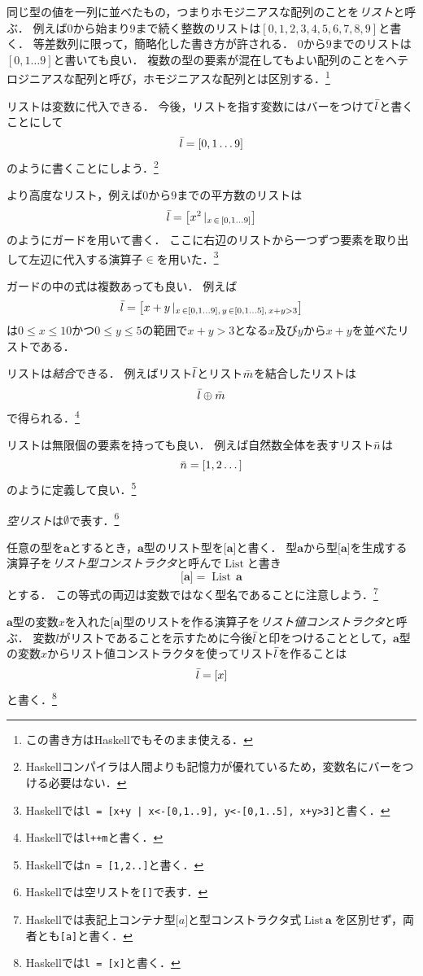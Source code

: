 \documentclass[twocolumn]{jsbook}
\newcommand{\keyword}[1]{\emph{#1}}
\newcommand{\code}[1]{\texttt{#1}}
\newcommand{\hsklType}[1]{\textbf{#1}}
\newcommand{\hsklTypeConstructor}[1]{\mathop{\mathrm{#1}}}
\DeclareMathOperator{\hsklListConstructor}{\hsklTypeConstructor{List}}
\newcommand{\hsklAppend}{\oplus}
\newcommand{\hsklEmptyList}{\emptyset}
\newcommand{\hsklList}[1]{\Bar{#1}}
\newcommand{\hsklListType}[1]{\boldsymbol{[}#1\boldsymbol{]}}
\newcommand{\hsklTypeConstruct}[2]{#1\,#2}
\DeclareMathOperator{\mathFrom}{\in}
\newcommand{\mathGuard}[1]{\mathop{\mid_{#1}}}
\begin{document}
同じ型の値を一列に並べたもの，つまりホモジニアスな配列のことを\keyword{リスト}と呼ぶ．
例えば$0$から始まり$9$まで続く整数のリストは$[0,1,2,3,4,5,6,7,8,9]$と書く．
等差数列に限って，簡略化した書き方が許される．
$0$から$9$までのリストは$[0,1\dots9]$と書いても良い．
複数の型の要素が混在してもよい配列のことをヘテロジニアスな配列と呼び，ホモジニアスな配列とは区別する．\footnote{この書き方はHaskellでもそのまま使える．}

リストは変数に代入できる．
今後，リストを指す変数にはバーをつけて$\hsklList{l}$と書くことにして$$\hsklList{l}=[0,1\dots9]$$のように書くことにしよう．\footnote{Haskellコンパイラは人間よりも記憶力が優れているため，変数名にバーをつける必要はない．}

より高度なリスト，例えば$0$から$9$までの平方数のリストは$$\hsklList{l}=\left[x^2\mathGuard{x\mathFrom{[0,1\dots9]}}\right]$$のようにガードを用いて書く．
ここに右辺のリストから一つずつ要素を取り出して左辺に代入する演算子$\mathFrom$を用いた．\footnote{Haskellでは\code{l = [x+y | x<-[0,1..9], y<-[0,1..5], x+y>3]}と書く．}

ガードの中の式は複数あっても良い．
例えば$$\hsklList{l}=\left[x+y\mathGuard{x\mathFrom[0,1\dots9],\,y\mathFrom[0,1\dots5],\,x+y>3}\right]$$は$0\le x\le 10$かつ$0\le y\le 5$の範囲で$x+y>3$となる$x$及び$y$から$x+y$を並べたリストである．

リストは\keyword{結合}できる．
例えばリスト$\hsklList{l}$とリスト$\hsklList{m}$を結合したリストは$$\hsklList{l}\hsklAppend\hsklList{m}$$で得られる．\footnote{Haskellでは\code{l++m}と書く．}

リストは無限個の要素を持っても良い．
例えば自然数全体を表すリスト$\hsklList{n}$は$$\hsklList{n}=[1,2\dots]$$のように定義して良い．\footnote{Haskellでは\code{n = [1,2..]}と書く．}

\keyword{空リスト}は$\hsklEmptyList$で表す．\footnote{Haskellでは空リストを\code{[]}で表す．}

任意の型を$\hsklType{a}$とするとき，$\hsklType{a}$型のリスト型を$\hsklListType{\hsklType{a}}$と書く．
型$\hsklType{a}$から型$\hsklListType{\hsklType{a}}$を生成する演算子を\keyword{リスト型コンストラクタ}と呼んで$\hsklListConstructor$と書き$$\hsklListType{\hsklType{a}}=\hsklTypeConstruct{\hsklListConstructor}{\hsklType{a}}$$とする．
この等式の両辺は変数ではなく型名であることに注意しよう．\footnote{Haskellでは表記上コンテナ型$\hsklListType{a}$と型コンストラクタ式$\hsklTypeConstruct{\hsklListConstructor}{\hsklType{a}}$を区別せず，両者とも\code{[a]}と書く．}

$\hsklType{a}$型の変数$x$を入れた$\hsklListType{\hsklType{a}}$型のリストを作る演算子を\keyword{リスト値コンストラクタ}と呼ぶ．
変数$l$がリストであることを示すために今後$\hsklList{l}$と印をつけることとして，$\hsklType{a}$型の変数$x$からリスト値コンストラクタを使ってリスト$\hsklList{l}$を作ることは$$\hsklList{l}=[x]$$と書く．\footnote{Haskellでは\code{l = [x]}と書く．}
\end{document}
